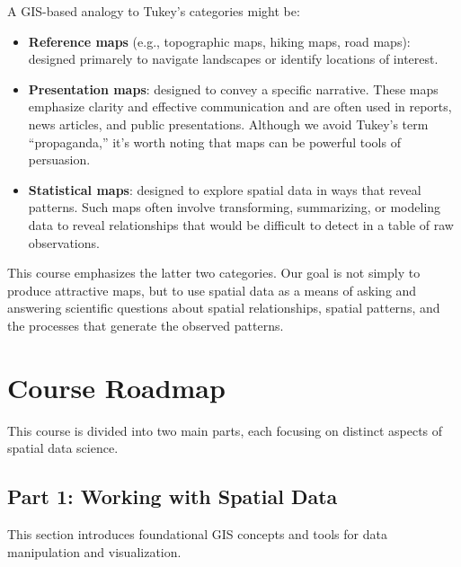 \documentclass[
  letterpaper,
]{book}
\providecommand{\tightlist}{%
  \setlength{\itemsep}{0pt}\setlength{\parskip}{0pt}}
\begin{document}
A GIS-based analogy to Tukey's categories might be:

\begin{itemize}
\tightlist
\item
  \textbf{Reference maps} (e.g., topographic maps, hiking maps, road
  maps): designed primarely to navigate landscapes or identify locations
  of interest.
\item
  \textbf{Presentation maps}: designed to convey a specific narrative.
  These maps emphasize clarity and effective communication and are often
  used in reports, news articles, and public presentations. Although we
  avoid Tukey's term ``propaganda,'' it's worth noting that maps can be
  powerful tools of persuasion.
\item
  \textbf{Statistical maps}: designed to explore spatial data in ways
  that reveal patterns. Such maps often involve transforming,
  summarizing, or modeling data to reveal relationships that would be
  difficult to detect in a table of raw observations.
\end{itemize}

This course emphasizes the latter two categories. Our goal is not simply
to produce attractive maps, but to use spatial data as a means of asking
and answering scientific questions about spatial relationships, spatial
patterns, and the processes that generate the observed patterns.

\section{Course Roadmap}\label{course-roadmap}

This course is divided into two main parts, each focusing on distinct
aspects of spatial data science.

\subsection{Part 1: Working with Spatial
Data}\label{part-1-working-with-spatial-data}

This section introduces foundational GIS concepts and tools for data
manipulation and visualization.
\end{document}

